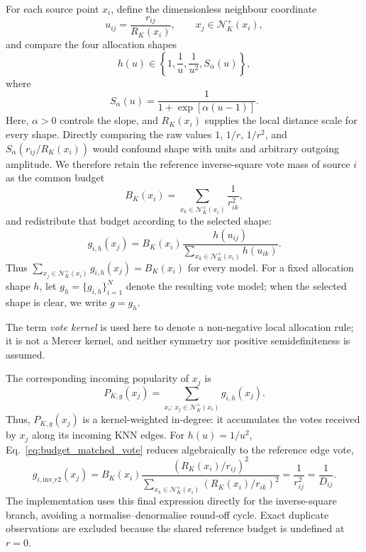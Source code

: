 \documentclass[pdflatex,sn-basic,Numbered]{sn-jnl}
\newcommand{\calN}{\mathcal{N}}
\begin{document}
For each source point $x_i$, define the dimensionless neighbour coordinate
\begin{equation}
u_{ij}=\frac{r_{ij}}{R_K(x_i)},
\qquad x_j\in\calN_K^+(x_i),
\label{eq:normalised_neighbour_distance}
\end{equation}
and compare the four allocation shapes
\begin{equation}
h(u)\in
\left\{
1,\frac{1}{u},\frac{1}{u^2},S_\alpha(u)
\right\},
\label{eq:vote_kernel_family}
\end{equation}
where
\begin{equation}
S_\alpha(u)=\frac{1}{1+\exp[\alpha(u-1)]}.
\label{eq:sigmoid_vote}
\end{equation}
Here, $\alpha>0$ controls the slope, and $R_K(x_i)$ supplies the local distance scale for every shape.  Directly comparing the raw values $1$, $1/r$, $1/r^2$, and $S_\alpha(r_{ij}/R_K(x_i))$ would confound shape with units and arbitrary outgoing amplitude.  We therefore retain the reference inverse-square vote mass of source $i$ as the common budget
\begin{equation}
B_K(x_i)=\sum_{x_k\in\calN_K^+(x_i)}\frac{1}{r_{ik}^2},
\label{eq:reference_source_budget}
\end{equation}
and redistribute that budget according to the selected shape:
\begin{equation}
g_{i,h}(x_j)=B_K(x_i)
\frac{h(u_{ij})}
{\displaystyle\sum_{x_k\in\calN_K^+(x_i)}h(u_{ik})}.
\label{eq:budget_matched_vote}
\end{equation}
Thus
$\sum_{x_j\in\calN_K^+(x_i)}g_{i,h}(x_j)=B_K(x_i)$
for every model. For a fixed allocation shape $h$, let
$g_h=\{g_{i,h}\}_{i=1}^{N}$ denote the resulting
vote model; when the selected shape is clear, we write $g=g_h$.

The term \emph{vote kernel} is used here to denote a non-negative local
allocation rule; it is not a Mercer kernel, and neither symmetry nor
positive semidefiniteness is assumed.

The corresponding incoming popularity of $x_j$ is
\begin{equation}
P_{K,g}(x_j)=
\sum_{x_i:\,x_j\in\calN_K^+(x_i)}g_{i,h}(x_j).
\label{eq:reverse_popularity}
\end{equation}
Thus, $P_{K,g}(x_j)$ is a kernel-weighted in-degree: it accumulates the
votes received by $x_j$ along its incoming KNN edges.
For $h(u)=1/u^2$, Eq.~\eqref{eq:budget_matched_vote} reduces algebraically to the reference edge vote,
\begin{equation}
g_{i,\mathrm{inv}\_r2}(x_j)
=B_K(x_i)\frac{(R_K(x_i)/r_{ij})^2}
{\sum_{x_k\in\calN_K^+(x_i)}(R_K(x_i)/r_{ik})^2}
=\frac{1}{r_{ij}^2}=\frac{1}{D_{ij}}.
\label{eq:reference_inverse_square_vote}
\end{equation}
The implementation uses this final expression directly for the inverse-square branch, avoiding a normalise--denormalise round-off cycle. Exact duplicate observations are excluded because the shared reference budget is undefined at $r=0$.
\end{document}
